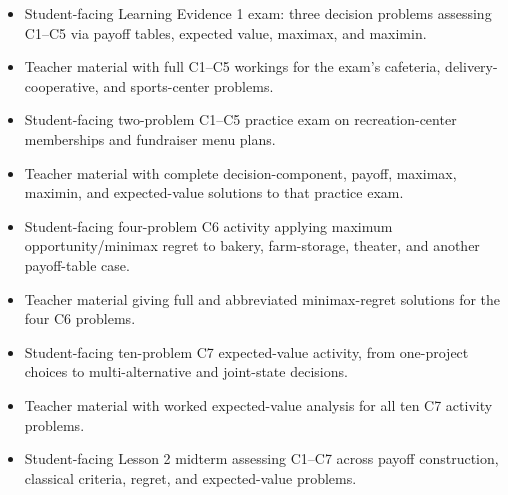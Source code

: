 \begin{itemize}
  \item {}

  Student-facing Learning Evidence 1 exam: three decision problems assessing C1–C5 via payoff tables, expected value, maximax, and maximin.

  \item {}

  Teacher material with full C1–C5 workings for the exam’s cafeteria, delivery-cooperative, and sports-center problems.

  \item {}

  Student-facing two-problem C1–C5 practice exam on recreation-center memberships and fundraiser menu plans.

  \item {}

  Teacher material with complete decision-component, payoff, maximax, maximin, and expected-value solutions to that practice exam.

  \item {}

  Student-facing four-problem C6 activity applying maximum opportunity/minimax regret to bakery, farm-storage, theater, and another payoff-table case.

  \item {}

  Teacher material giving full and abbreviated minimax-regret solutions for the four C6 problems.

  \item {}

  Student-facing ten-problem C7 expected-value activity, from one-project choices to multi-alternative and joint-state decisions.

  \item {}

  Teacher material with worked expected-value analysis for all ten C7 activity problems.

  \item {}

  Student-facing Lesson 2 midterm assessing C1–C7 across payoff construction, classical criteria, regret, and expected-value problems.


\end{itemize}
